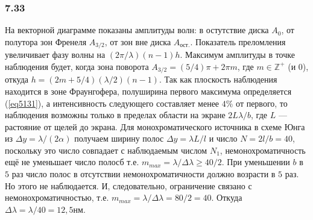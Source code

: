 \subsubsection*{7.33}
На векторной диаграмме показаны амплитуды волн: в остутствие диска $A_0$, от полутора зон Френеля $A_{3/2}$, от зон вне диска $A_{ост.}$. Показатель преломления увеличивает фазу волны на $(2\pi / \lambda)(n - 1)h$. Максимум амплитуды в точке наблюдения будет, когда зона поворота $A_{3/2} = (5/4)\pi + 2\pi m $, где $m \in \mathbb{Z}^+$ (и $0$), откуда $h = (2m + 5/4)(\lambda/2)(n-1)$.
Так как плоскость наблюдения находится в зоне Фраунгофера, полуширина первого максимума определяется (\ref{eq5131}), а интенсивность следующего составляет менее $4\%$ от первого, то наблюдения возможны только в пределах области на экране $2L\lambda/b$, где $L$ --- растояние от щелей до экрана. Для монохроматического источника в схеме Юнга из $\Delta y = \lambda / (2\alpha)$ получаем ширину полос $\Delta y = \lambda L / l$ и число $N = 2l /b = 40$, поскольку это число совпадает с наблюдаемым числом $N_1$, немонохроматичность ещё не уменьшает число полосб т.е. $m_{max} = \lambda / \Delta \lambda \geq 40/2$. При уменьшении $b$ в $5$ раз число полос в отсутствии немонохроматичности должно возрасти в $5$ раз. Но этого не наблюдается. И, следовательно, ограничение связано с немонохроматичностью, т.е. $m_{max} = \lambda / \Delta \lambda = 80/2 = 40$. Откуда $\Delta \lambda = \lambda / 40 = 12,5 нм$.